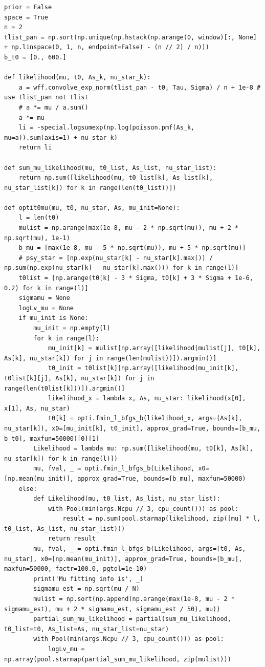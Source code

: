 \documentclass[notitlepage]{article}
\begin{document}
\begin{lstlisting}
prior = False
space = True
n = 2
tlist_pan = np.sort(np.unique(np.hstack(np.arange(0, window)[:, None] + np.linspace(0, 1, n, endpoint=False) - (n // 2) / n)))
b_t0 = [0., 600.]

def likelihood(mu, t0, As_k, nu_star_k):
    a = wff.convolve_exp_norm(tlist_pan - t0, Tau, Sigma) / n + 1e-8 # use tlist_pan not tlist
    # a *= mu / a.sum()
    a *= mu
    li = -special.logsumexp(np.log(poisson.pmf(As_k, mu=a)).sum(axis=1) + nu_star_k)
    return li

def sum_mu_likelihood(mu, t0_list, As_list, nu_star_list):
    return np.sum([likelihood(mu, t0_list[k], As_list[k], nu_star_list[k]) for k in range(len(t0_list))])

def optit0mu(mu, t0, nu_star, As, mu_init=None):
    l = len(t0)
    mulist = np.arange(max(1e-8, mu - 2 * np.sqrt(mu)), mu + 2 * np.sqrt(mu), 1e-1)
    b_mu = [max(1e-8, mu - 5 * np.sqrt(mu)), mu + 5 * np.sqrt(mu)]
    # psy_star = [np.exp(nu_star[k] - nu_star[k].max()) / np.sum(np.exp(nu_star[k] - nu_star[k].max())) for k in range(l)]
    t0list = [np.arange(t0[k] - 3 * Sigma, t0[k] + 3 * Sigma + 1e-6, 0.2) for k in range(l)]
    sigmamu = None
    logLv_mu = None
    if mu_init is None:
        mu_init = np.empty(l)
        for k in range(l):
            mu_init[k] = mulist[np.array([likelihood(mulist[j], t0[k], As[k], nu_star[k]) for j in range(len(mulist))]).argmin()]
            t0_init = t0list[k][np.array([likelihood(mu_init[k], t0list[k][j], As[k], nu_star[k]) for j in range(len(t0list[k]))]).argmin()]
            likelihood_x = lambda x, As, nu_star: likelihood(x[0], x[1], As, nu_star)
            t0[k] = opti.fmin_l_bfgs_b(likelihood_x, args=(As[k], nu_star[k]), x0=[mu_init[k], t0_init], approx_grad=True, bounds=[b_mu, b_t0], maxfun=50000)[0][1]
        Likelihood = lambda mu: np.sum([likelihood(mu, t0[k], As[k], nu_star[k]) for k in range(l)])
        mu, fval, _ = opti.fmin_l_bfgs_b(Likelihood, x0=[np.mean(mu_init)], approx_grad=True, bounds=[b_mu], maxfun=50000)
    else:
        def Likelihood(mu, t0_list, As_list, nu_star_list):
            with Pool(min(args.Ncpu // 3, cpu_count())) as pool:
                result = np.sum(pool.starmap(likelihood, zip([mu] * l, t0_list, As_list, nu_star_list)))
            return result
        mu, fval, _ = opti.fmin_l_bfgs_b(Likelihood, args=[t0, As, nu_star], x0=[np.mean(mu_init)], approx_grad=True, bounds=[b_mu], maxfun=50000, factr=100.0, pgtol=1e-10)
        print('Mu fitting info is', _)
        sigmamu_est = np.sqrt(mu / N)
        mulist = np.sort(np.append(np.arange(max(1e-8, mu - 2 * sigmamu_est), mu + 2 * sigmamu_est, sigmamu_est / 50), mu))
        partial_sum_mu_likelihood = partial(sum_mu_likelihood, t0_list=t0, As_list=As, nu_star_list=nu_star)
        with Pool(min(args.Ncpu // 3, cpu_count())) as pool:
            logLv_mu = np.array(pool.starmap(partial_sum_mu_likelihood, zip(mulist)))


\end{lstlisting}
\end{document}
